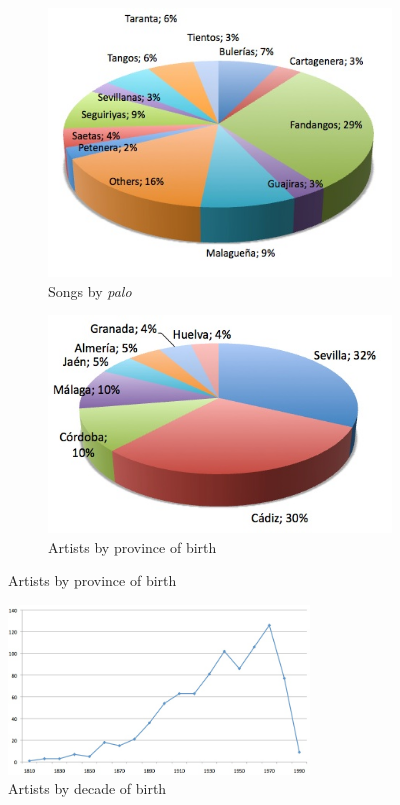 \begin{figure}[ht!]
    \centering
    \begin{subfigure}{.45\textwidth}
        \centering
        \includegraphics[width=.9\linewidth]{ch05_musicology_pics/Songs-by-palo.jpg}
    	\caption{Songs by \textit{palo}}
        \label{fig:musicology:graph-palo}
    \end{subfigure}
    \begin{subfigure}{.50\textwidth}
        \centering
        \includegraphics[width=.9\linewidth]{ch05_musicology_pics/Artists-by-province.jpg}
		\caption{Artists by province of birth}
		\label{fig:musicology:graph-province}
    \end{subfigure}
\end{figure}


\begin{figure}[!ht]
	\centering
	\includegraphics[width=8cm]{ch05_musicology_pics/Artists-by-decade-of-birth.jpg}
	\caption{Artists by decade of birth 
	\label{fig:musicology:graph-decade}}
\end{figure}


